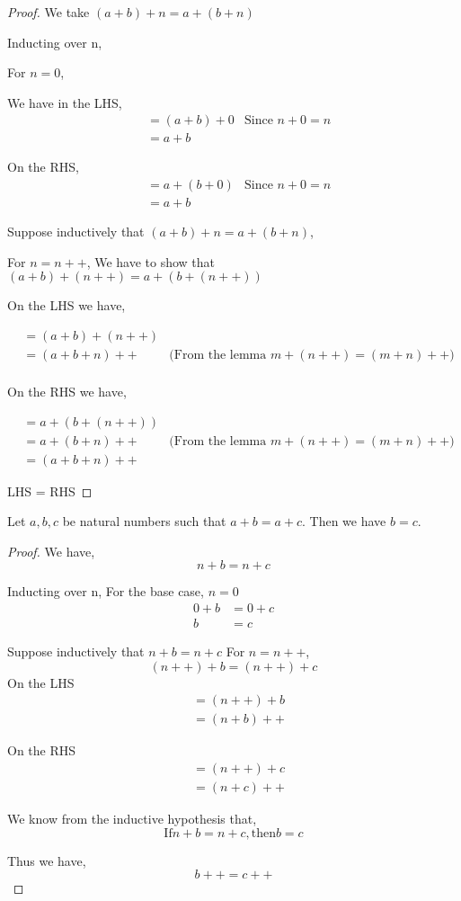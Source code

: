 \documentclass[11pt]{report}
\begin{document}
\begin{proof}
	We take $(a+b)+n = a + (b+n)$

	Inducting over n,

	For $n=0$,

	We have in the LHS,
	\begin{align*}
		 & =(a+b)+0 & \text{Since $n+0 = n$} \\
		 & =a+b
	\end{align*}

	On the RHS,
	\begin{align*}
		 & =a + (b+0) & \text{Since $n+0 = n$} \\
		 & =a + b
	\end{align*}

	Suppose inductively that $(a+b)+n = a+(b+n)$,

	For $n=n++$,
	We have to show that $(a+b)+(n++) = a+(b+(n++))$

	On the LHS we have,

	\begin{align*}
		 & =(a+b)+(n++)                                               \\
		 & =(a+b+n)++   & \text{(From the lemma $m+(n++) = (m+n)++$)} \\
	\end{align*}

	On the RHS we have,

	\begin{align*}
		 & =a+(b+(n++))                                               \\
		 & =a+(b+n)++   & \text{(From the lemma $m+(n++) = (m+n)++$)} \\
		 & =(a+b+n)++
	\end{align*}

	LHS = RHS
\end{proof}

\begin{prop}
	Let $a,b,c$ be natural numbers such that $a+b=a+c$. Then we have $b=c$.
\end{prop}
\begin{proof}
	We have,
	$$n+b=n+c$$

	Inducting over n,
	For the base case, $n=0$
	\begin{align*}
		0 + b & = 0 + c \\
		b     & = c
	\end{align*}

	Suppose inductively that $n+b=n+c$
	For $n=n++$,
	$$(n++)+b=(n++)+c$$
	On the LHS
	\begin{align*}
		 & =(n++) + b \\
		 & =(n+b)++
	\end{align*}

	On the RHS
	\begin{align*}
		 & =(n++) + c \\
		 & =(n+c)++
	\end{align*}

	We know from the inductive hypothesis that,
	$$\text{If} n+b = n+c, \text{then} b = c$$

	Thus we have,
	$$b++ = c++$$
\end{proof}
\end{document}
